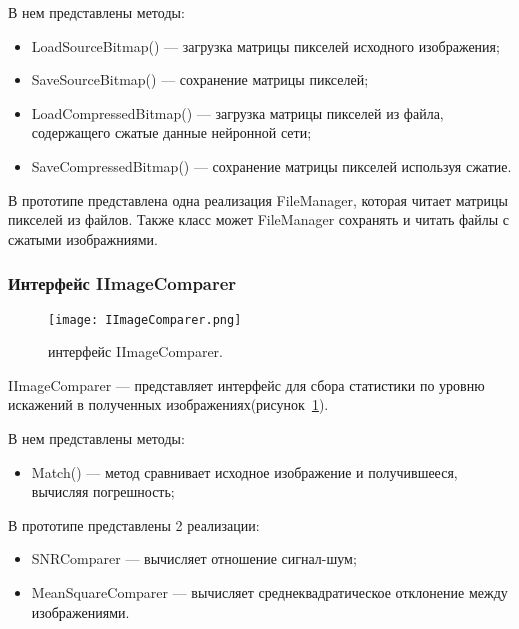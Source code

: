 В нем представлены методы:
\begin{itemize}
  \item LoadSourceBitmap() --- загрузка матрицы пикселей исходного изображения;
  \item SaveSourceBitmap() --- сохранение матрицы пикселей;
  \item LoadCompressedBitmap() --- загрузка матрицы пикселей из файла, содержащего сжатые данные нейронной сети;
  \item SaveCompressedBitmap() --- сохранение матрицы пикселей используя сжатие.
\end{itemize}

В прототипе представлена одна реализация FileManager, которая читает матрицы пикселей из файлов.
Также класс может FileManager сохранять и читать файлы с сжатыми изображниями.

\subsubsection{Интерфейс IImageComparer}
\label{subsub:development:types:iimagecomparer}

\begin{figure}[ht]
\centering
  \texttt{[image: IImageComparer.png]}
  \caption{ интерфейс IImageComparer. }
  \label{fig:iimagecomparer}
\end{figure}
IImageComparer --- представляет интерфейс для сбора статистики по уровню искажений в полученных изображениях(рисунок~\ref{fig:iimagecomparer}).

В нем представлены методы:
\begin{itemize}
  \item Match() --- метод сравнивает исходное изображение и получившееся, вычисляя погрешность;
\end{itemize}

В прототипе представлены 2 реализации:
\begin{itemize}
  \item SNRComparer --- вычисляет отношение сигнал-шум;
  \item MeanSquareComparer --- вычисляет среднеквадратическое отклонение между изображениями.
\end{itemize}
